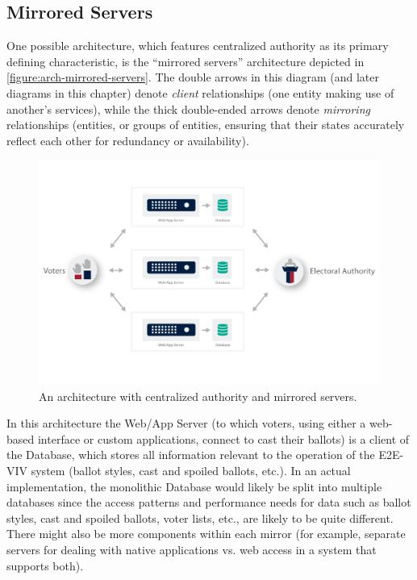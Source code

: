 \subsection{Mirrored Servers}

One possible architecture, which features centralized authority as its
primary defining characteristic, is the ``mirrored servers''
architecture depicted in \autoref{figure:arch-mirrored-servers}. The
double arrows in this diagram (and later diagrams in this chapter)
denote \emph{client} relationships (one entity making use of another's
services), while the thick double-ended arrows denote \emph{mirroring}
relationships (entities, or groups of entities, ensuring that their
states accurately reflect each other for redundancy or availability).

\begin{figure}[t]
\begin{center}
\includegraphics[width=6.5in]{architecture_resources/mirrored-servers.pdf}
\end{center}
\vspace*{-10ex}
\caption{An architecture with centralized authority and mirrored
  servers.}
\label{figure:arch-mirrored-servers}
\end{figure}

In this architecture the Web/App Server (to which voters, using either
a web-based interface or custom applications, connect to cast their
ballots) is a client of the Database, which stores all information
relevant to the operation of the E2E-VIV system (ballot styles, cast
and spoiled ballots, etc.). In an actual implementation, the
monolithic Database would likely be split into multiple databases
since the access patterns and performance needs for data such as
ballot styles, cast and spoiled ballots, voter lists, etc., are likely
to be quite different. There might also be more components within each
mirror (for example, separate servers for dealing with native
applications vs. web access in a system that supports both).

